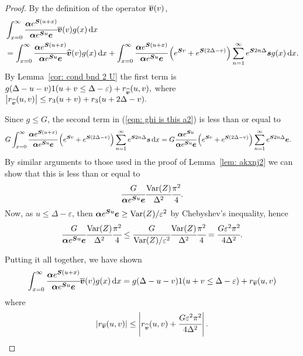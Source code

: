 \begin{proof}
	By the definition of the operator \(\overline{\boldsymbol v}(v)\), 
	\begin{align}
		&\int_{x=0}^\infty \cfrac{\boldsymbol \alpha  e^{\boldsymbol{S} (u+x)} }{\boldsymbol \alpha  e^{\boldsymbol{S} u} \boldsymbol e} \overline{\boldsymbol v}(v)g(x)\, \mathrm{d} x \nonumber		
		\\&= \int_{x=0}^\infty \cfrac{\boldsymbol \alpha  e^{\boldsymbol{S} (u+x)} }{\boldsymbol \alpha  e^{\boldsymbol{S} u} \boldsymbol e} {\widehat{\boldsymbol v}}(v)g(x)\, \mathrm{d} x + \int_{x=0}^\infty \cfrac{\boldsymbol \alpha  e^{\boldsymbol{S} (u+x)} }{\boldsymbol \alpha  e^{\boldsymbol{S} u} \boldsymbol e} \left(e^{\boldsymbol{S} v} + e^{\boldsymbol{S} (2\Delta-v)}\right)\sum_{n=1}^\infty e^{\boldsymbol S2n\Delta}\boldsymbol s g(x)\, \mathrm{d} x. \label{eqn: ghi is this a2}
	\end{align}
	By Lemma~\ref{cor: cond bnd 2 U} the first term is 
	\(g(\Delta-u-v) 1(u+v\leq\Delta-\varepsilon) + r_{{\widehat{\boldsymbol v}}} (u,v),\)
	where 
	\(\left|r_{\widehat{\boldsymbol v}} (u,v)\right|\leq r_3 (u+v) + r_3 (u+2\Delta - v).\)

	Since \(g\leq G\), the second term in (\ref{eqn: ghi is this a2}) is less than or equal to 
	\begin{align*}
		G\int_{x=0}^\infty \cfrac{\boldsymbol \alpha  e^{\boldsymbol{S} (u+x)} }{\boldsymbol \alpha  e^{\boldsymbol{S} u} \boldsymbol e} \left(e^{\boldsymbol{S} v} + e^{\boldsymbol{S} (2\Delta-v)}\right)\sum_{n=1}^\infty e^{\boldsymbol S2n\Delta}\boldsymbol s \, \mathrm{d} x
		&= G \cfrac{\boldsymbol \alpha  e^{\boldsymbol{S} u} }{\boldsymbol \alpha  e^{\boldsymbol{S} u} \boldsymbol e} \left(e^{\boldsymbol{S} v} + e^{\boldsymbol{S} (2\Delta-v)}\right)\sum_{n=1}^\infty e^{\boldsymbol S2n\Delta}\boldsymbol e.
	\end{align*}
	By similar arguments to those used in the proof of Lemma~\ref{lem: akxnj2} we can show that this is less than or equal to 
	\begin{align*}
		\cfrac{G}{\boldsymbol \alpha  e^{\boldsymbol{S} u} \boldsymbol e} \cfrac{\mathrm{Var}(Z)}{\Delta^2}\cfrac{\pi^2}{4}.
	\end{align*}
	Now, as \(u\leq \Delta-\varepsilon\), then \(\boldsymbol\alpha e^{\boldsymbol Su}\boldsymbol e\geq \mathrm{Var}(Z)/\varepsilon^2\) by Chebyshev's inequality, hence 
	\begin{align*}
		\cfrac{G}{\boldsymbol \alpha  e^{\boldsymbol{S} u} \boldsymbol e} \cfrac{\mathrm{Var}(Z)}{\Delta^2}\cfrac{\pi^2}{4} \leq \cfrac{G}{\mathrm{Var}(Z)/\varepsilon^2} \cfrac{\mathrm{Var}(Z)}{\Delta^2}\cfrac{\pi^2}{4} = \cfrac{G \varepsilon^2 \pi^2}{4\Delta^2}.
	\end{align*}

	Putting it all together, we have shown 
	\begin{align}
		\int_{x=0}^\infty \cfrac{\boldsymbol \alpha  e^{\boldsymbol{S} (u+x)} }{\boldsymbol \alpha  e^{\boldsymbol{S} u} \boldsymbol e} \overline{\boldsymbol v}(v)g(x)\, \mathrm{d} x = g(\Delta-u-v) 1(u+v\leq\Delta-\varepsilon) + r_{\overline{\boldsymbol v}} (u,v)
	\end{align}
	where 
	\[|r_{\overline{\boldsymbol v}} (u,v)| \leq \left|r_{\widehat{\boldsymbol v}} (u,v) + \cfrac{G \varepsilon^2 \pi^2}{4\Delta^2}\right|.\]
	

\end{proof}

